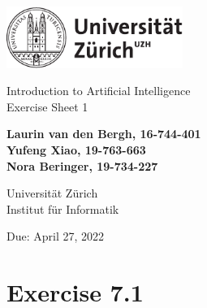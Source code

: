 \documentclass[12pt]{article}
\begin{document}
\begin{titlepage}
\includegraphics[height=20mm]{../images/uzh_logo}\\

\begin{flushleft}

\vspace{2cm}

{\Large Introduction to Artificial Intelligence\\Exercise Sheet 1}\\

\vspace{4cm}

\textbf{Laurin van den Bergh, 16-744-401\\Yufeng Xiao, 19-763-663\\Nora Beringer, 19-734-227}\\

\vspace{2cm}

Universität Zürich\\
Institut für Informatik

\vfill Due: April 27, 2022

\vspace{3cm}


\end{flushleft}
\end{titlepage}

\newpage

\section*{Exercise 7.1}
\end{document}
